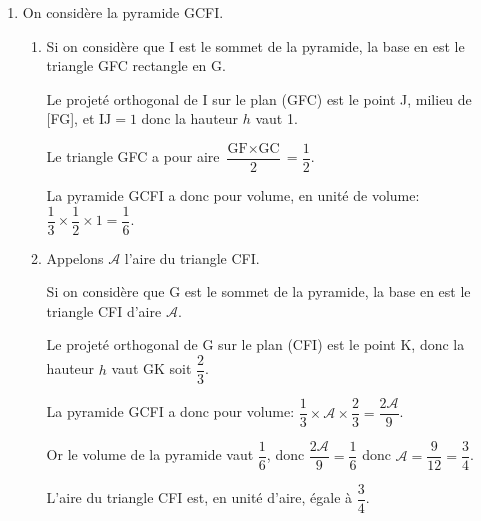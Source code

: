 \begin{enumerate}
\begin{enumerate}
Donc le projeté orthogonal K du point G sur le plan (CFI) a pour coordonnées $\left (\dfrac{7}{9}\;; \dfrac{5}{9}\;; \dfrac{5}{9} \right )$.
		\item La distance du point G au plan (CFI) est:
		
$\begin{gathered}\text{GK}= \ds\sqrt{(x_{\text K} - x_{\text G})^2 + (y_{\text K} - y_{\text G})^2 +(z_{\text K} - z_{\text G})^2 }
= \ds\sqrt{\left ( \frac{7}{9} - 1\right )^2 + \left ( \frac{5}{9} - 1\right )^2+\left ( \frac{5}{9} - 1\right )^2}\\
\phantom{\text{GK}}
= \ds\sqrt{\left ( -\frac{2}{9}\right )^2 + \left ( -\frac{4}{9}\right )^2+\left ( -\frac{4}{9}\right )^2}
=\ds\sqrt{\frac{4}{81} + \frac{16}{81} + \frac{16}{81}}
=\ds\sqrt{ \frac{36}{81}}
= \frac{6}{9}
= \frac23\end{gathered}$.
	\end{enumerate}
	
\item On considère la pyramide GCFI.







	\begin{enumerate}
		\item 
Si on considère que I est le sommet de la pyramide, la base en est le triangle GFC rectangle en G.

Le projeté orthogonal de I sur le plan (GFC) est le point J, milieu de [FG], et $\text{IJ}=1$ donc la hauteur $h$ vaut 1.

Le triangle GFC a pour aire $\dfrac{\text{GF}\times \text{GC}}{2} = \dfrac{1}{2}$.

La pyramide GCFI a donc pour volume, en unité de volume:  $\dfrac{1}{3}\times \dfrac{1}{2}\times 1 = \dfrac{1}{6}$.
		
		\item Appelons $\mathcal{A}$ l'aire du triangle CFI.
		
Si on considère que G est le sommet de la pyramide, la base en est le triangle CFI d'aire $\mathcal{A}$.

Le projeté orthogonal de G sur le plan (CFI) est le point K, donc la hauteur $h$ vaut GK soit $\dfrac{2}{3}$.

La pyramide GCFI a donc pour volume:  $\dfrac{1}{3}\times \mathcal{A}\times \dfrac{2}{3} = \dfrac{2\mathcal{A}}{9}$.

Or le volume de la pyramide vaut $\dfrac{1}{6}$, donc $\dfrac{2\mathcal{A}}{9} = \dfrac{1}{6}$ donc $\mathcal{A}=\dfrac{9}{12}=\dfrac{3}{4}$.

L'aire du triangle CFI est, en unité d'aire, égale à $\dfrac{3}{4}$.
		
	\end{enumerate}
\end{enumerate}
